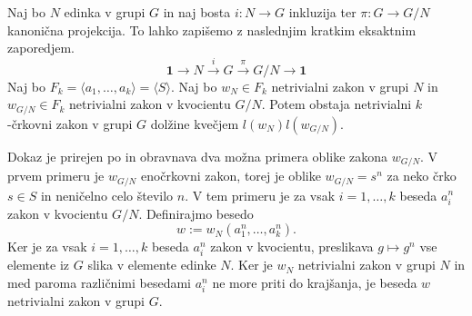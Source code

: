 \begin{lema}\label{lem_razsiritvena_lema}
    Naj bo $N$ edinka v grupi $G$ in naj bosta $i : N \to G$ inkluzija ter $\pi : G \to G / N$ kanonična projekcija. To lahko zapišemo z naslednjim kratkim eksaktnim zaporedjem. \begin{equation*}
        \mathbf{1} \to N \xrightarrow{i} G \xrightarrow{\pi} G / N \to  \mathbf{1}  
    \end{equation*}  
    Naj bo $F_k = \langle a_1, \ldots, a_k \rangle  = \langle S \rangle$. Naj bo $w_N \in F_k$ netrivialni zakon v grupi $N$ in $w_{ G / N} \in  F_k$ netrivialni zakon v kvocientu $G / N$. 
    Potem obstaja netrivialni $k$-črkovni zakon v grupi $G$ dolžine kvečjem $l(w_N) l( w_{ G / N } )$.
\end{lema}
\begin{dokaz}
    Dokaz je prirejen po \cite[str.~10]{Schneider_2016} in obravnava dva možna primera oblike zakona $w_{ G / N }$. 
     V prvem primeru je $w_{ G / N }$ enočrkovni zakon, torej je oblike $w_{G / N} = s^{n}$ za neko črko $s \in S$ in neničelno celo število $n$. V tem primeru je za vsak $i = 1, \ldots, k$ beseda $a_i^n$ zakon v kvocientu $G / N$. Definirajmo besedo \begin{equation*}
        w := w_N(a_1^{n}, \ldots, a_{k}^{n}).
        \end{equation*}  
        Ker je za vsak $i = 1, \ldots, k$ beseda $a_i^n$ zakon v kvocientu, preslikava $g \mapsto g^n$ vse elemente iz $G$ slika v elemente edinke $N$. Ker je $w_N$ netrivialni zakon v grupi $N$ in med paroma različnimi besedami $a_i^n$ ne more priti do krajšanja,
        je beseda $w$ netrivialni zakon v grupi $G$.
        

\end{dokaz}
